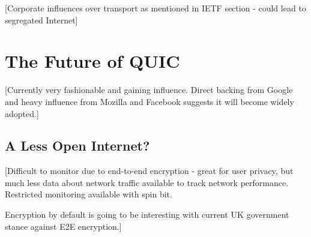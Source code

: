 \documentclass{l4proj}
\begin{document}
[Corporate influences over transport as mentioned in IETF section - could lead to segregated Internet]

\section{The Future of QUIC}
[Currently very fashionable and gaining influence. Direct backing from Google and heavy influence from Mozilla and Facebook suggests it will become widely adopted.]

\subsection{A Less Open Internet?}
[Difficult to monitor due to end-to-end encryption - great for user privacy, but much less data about network traffic available to track network performance. Restricted monitoring available with spin bit.

Encryption by default is going to be interesting with current UK government stance against E2E encryption.]



\end{document}

